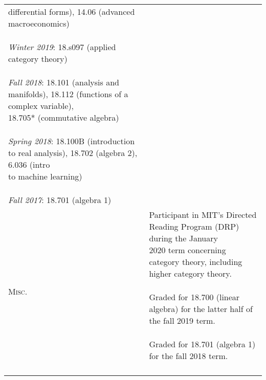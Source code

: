\documentclass[a4paper,10pt]{article} %
\begin{document}
\begin{tabularx}{\textwidth}{l X}
{  differential forms), 14.06 (advanced macroeconomics)\\ \\
  \textit{Winter 2019}: 18.s097 (applied category theory)\\ \\ 
  \textit{Fall 2018}: 18.101 (analysis and manifolds), 18.112 (functions of a complex variable),\\
  18.705* (commutative algebra)\\ \\
  \textit{Spring 2018}: 18.100B (introduction to real analysis), 18.702 (algebra 2), 6.036 (intro\\
  to machine learning)\\ \\
  \textit{Fall 2017}: 18.701 (algebra 1)
}\\
\textsc{Misc.}
& \Longunderstack{
      Participant in MIT's Directed Reading Program (DRP) during the January \\
      2020 term concerning category theory, including higher category theory.\\\\
      Graded for 18.700 (linear algebra) for the latter half of the fall 2019 term.\\ \\
      Graded for 18.701 (algebra 1) for the fall 2018 term.\\ \\
    }
\end{tabularx}
\end{document}
